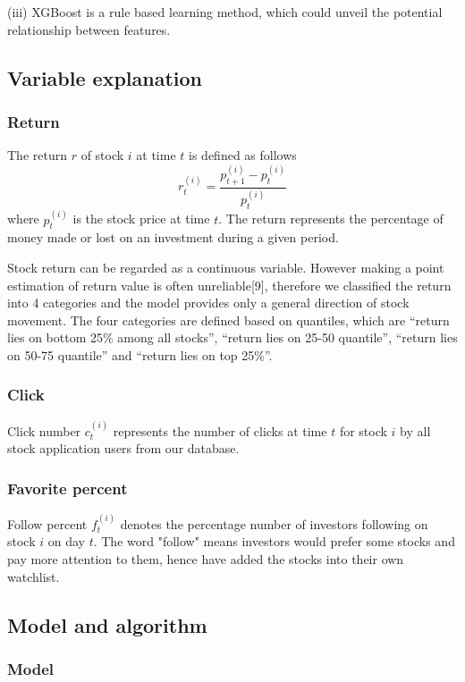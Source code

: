 \documentclass[letterpaper]{article}
\begin{document}
(iii) XGBoost is a rule based learning method, which could unveil the potential relationship between features.


\subsection{Variable explanation}
\subsubsection{Return}
The return $r$ of stock $i$ at time $t$ is defined as follows
$$
r_{t}^{(i)}=\frac{p_{t+1}^{(i)}-p_{t}^{(i)}}{p_{t}^{(i)}}
$$
where $p_{t}^{(i)}$ is the stock price at time $t$. The return represents the percentage of money made or lost on an investment during a given period.

Stock return can be regarded as a continuous variable. However making a point estimation of return value is often unreliable[9], therefore we classified the return into 4 categories and the model provides only a general direction of stock movement. The four categories are defined based on quantiles, which are “return lies on bottom 25\% among all stocks”, “return lies on 25-50 quantile”, “return lies on 50-75 quantile” and “return lies on top 25\%”. 
\subsubsection{Click}

Click number $c^{(i)}_{t}$ represents the number of clicks at time $t$ for stock $i$ by all stock application users from our database.

\subsubsection{Favorite percent}

Follow percent $f^{(i)}_{t}$ denotes the percentage number of investors following on stock $i$ on day $t$. The word "follow" means investors would prefer some stocks and pay more attention to them, hence have added the stocks into their own watchlist. 

\subsection{Model and algorithm}

\subsubsection{Model}
\end{document}
